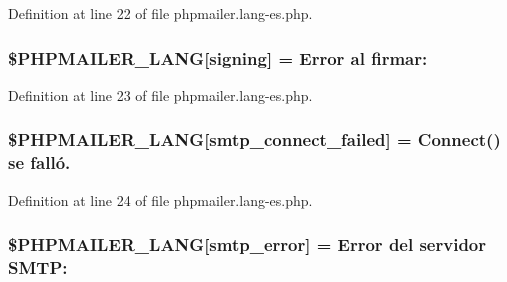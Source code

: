 Definition at line 22 of file phpmailer.\+lang-\/es.\+php.

\subsubsection[{\texorpdfstring{\$\+P\+H\+P\+M\+A\+I\+L\+E\+R\+\_\+\+L\+A\+NG}{$PHPMAILER_LANG}}]{\setlength{\rightskip}{0pt plus 5cm}\$P\+H\+P\+M\+A\+I\+L\+E\+R\+\_\+\+L\+A\+NG\mbox{[}\textquotesingle{}signing\textquotesingle{}\mbox{]} = \textquotesingle{}Error al firmar\+: \textquotesingle{}}\hypertarget{phpmailer_8lang-es_8php_a68e437bdb9b968a5a67320f03d231565}{}\label{phpmailer_8lang-es_8php_a68e437bdb9b968a5a67320f03d231565}


Definition at line 23 of file phpmailer.\+lang-\/es.\+php.

\subsubsection[{\texorpdfstring{\$\+P\+H\+P\+M\+A\+I\+L\+E\+R\+\_\+\+L\+A\+NG}{$PHPMAILER_LANG}}]{\setlength{\rightskip}{0pt plus 5cm}\$P\+H\+P\+M\+A\+I\+L\+E\+R\+\_\+\+L\+A\+NG\mbox{[}\textquotesingle{}smtp\+\_\+connect\+\_\+failed\textquotesingle{}\mbox{]} =  Connect() se falló.\textquotesingle{}}\hypertarget{phpmailer_8lang-es_8php_a7b321d4ca1e9df702403ed4c61aa0980}{}\label{phpmailer_8lang-es_8php_a7b321d4ca1e9df702403ed4c61aa0980}


Definition at line 24 of file phpmailer.\+lang-\/es.\+php.

\subsubsection[{\texorpdfstring{\$\+P\+H\+P\+M\+A\+I\+L\+E\+R\+\_\+\+L\+A\+NG}{$PHPMAILER_LANG}}]{\setlength{\rightskip}{0pt plus 5cm}\$P\+H\+P\+M\+A\+I\+L\+E\+R\+\_\+\+L\+A\+NG\mbox{[}\textquotesingle{}smtp\+\_\+error\textquotesingle{}\mbox{]} = \textquotesingle{}Error del servidor S\+M\+T\+P\+: \textquotesingle{}}\hypertarget{phpmailer_8lang-es_8php_a7d9cffba1e669c845f8a4c891ee50064}{}\label{phpmailer_8lang-es_8php_a7d9cffba1e669c845f8a4c891ee50064}



